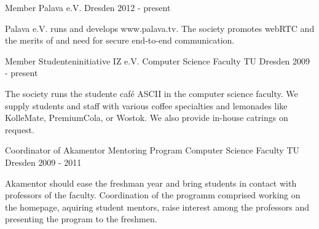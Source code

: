 \begin{cventries}
  \cventry
    {Member Palava e.V.}
    {}
    {Dresden}
    {2012 - present}
    {
      \begin{cvitems}
      \item[] {Palava e.V. runs and develops www.palava.tv. The society promotes
      webRTC and the merits of and need for secure end-to-end communication.}
      \end{cvitems}
    }
  \cventry
    {Member Studenteninitiative IZ e.V.}
    {Computer Science Faculty}
    {TU Dresden}
    {2009 - present}
    {
      \begin{cvitems}
      \item[] {The society runs the studente caf\'{e} ASCII in the computer science
      faculty. We supply students and staff with various coffee specialties and
      lemonades like KolleMate, PremiumCola, or Wostok. We also provide in-house
      catrings on request.}
      \end{cvitems}
    }
  \cventry
    {Coordinator of Akamentor Mentoring Program}
    {Computer Science Faculty}
    {TU Dresden}
    {2009 - 2011}
    {
      \begin{cvitems}
      \item[] {Akamentor should ease the freshman year and bring students in contact
      with professors of the faculty. Coordination of the programm comprised
      working on the homepage, aquiring student mentors, raise interest among
      the professors and presenting the program to the freshmen.}
      \end{cvitems}
    }
\end{cventries}
